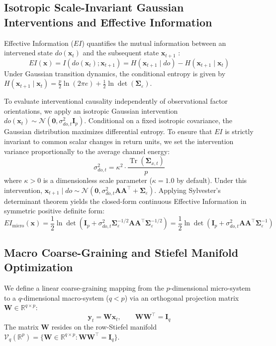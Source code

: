 \documentclass[review,12pt,authoryear]{elsarticle}
\begin{document}
\subsection{Isotropic Scale-Invariant Gaussian Interventions and Effective Information}
Effective Information ($EI$) quantifies the mutual information between an intervened state $do(\mathbf{x}_t)$ and the subsequent state $\mathbf{x}_{t+1}$ \citep{hoel2013quantifying}:
\begin{equation}
EI(\mathbf{x}) = I(do(\mathbf{x}_t); \mathbf{x}_{t+1}) = H(\mathbf{x}_{t+1} \mid do) - H(\mathbf{x}_{t+1} \mid \mathbf{x}_t)
\label{eq:ei_def_eq}
\end{equation}
Under Gaussian transition dynamics, the conditional entropy is given by $H(\mathbf{x}_{t+1} \mid \mathbf{x}_t) = \frac{p}{2}\ln(2\pi e) + \frac{1}{2}\ln\det(\boldsymbol{\Sigma}_\varepsilon)$.

To evaluate interventional causality independently of observational factor orientations, we apply an isotropic Gaussian intervention $do(\mathbf{x}_t) \sim \mathcal{N}(\mathbf{0}, \sigma_{do,t}^2 \mathbf{I}_p)$. Conditional on a fixed isotropic covariance, the Gaussian distribution maximizes differential entropy. To ensure that $EI$ is strictly invariant to common scalar changes in return units, we set the intervention variance proportionally to the average channel energy:
\begin{equation}
\sigma_{do,t}^2 = \kappa^2 \cdot \frac{\operatorname{Tr}(\boldsymbol{\Sigma}_{x,t})}{p}
\label{eq:scale_inv_def}
\end{equation}
where $\kappa > 0$ is a dimensionless scale parameter ($\kappa = 1.0$ by default). Under this intervention, $\mathbf{x}_{t+1} \mid do \sim \mathcal{N}(\mathbf{0}, \sigma_{do,t}^2 \mathbf{A}\mathbf{A}^\top + \boldsymbol{\Sigma}_\varepsilon)$. Applying Sylvester's determinant theorem yields the closed-form continuous Effective Information in symmetric positive definite form:
\begin{equation}
EI_{\text{micro}}(\mathbf{x}) = \frac{1}{2} \ln \det\left( \mathbf{I}_p + \sigma_{do,t}^2 \boldsymbol{\Sigma}_\varepsilon^{-1/2} \mathbf{A}\mathbf{A}^\top \boldsymbol{\Sigma}_\varepsilon^{-1/2} \right) = \frac{1}{2} \ln \det\left( \mathbf{I}_p + \sigma_{do,t}^2 \mathbf{A}\mathbf{A}^\top \boldsymbol{\Sigma}_\varepsilon^{-1} \right)
\label{eq:ei_micro_closed}
\end{equation}

\subsection{Macro Coarse-Graining and Stiefel Manifold Optimization}
We define a linear coarse-graining mapping from the $p$-dimensional micro-system to a $q$-dimensional macro-system ($q < p$) via an orthogonal projection matrix $\mathbf{W} \in \mathbb{R}^{q \times p}$:
\begin{equation}
\mathbf{y}_t = \mathbf{W}\mathbf{x}_t, \qquad \mathbf{W}\mathbf{W}^\top = \mathbf{I}_q
\end{equation}
The matrix $\mathbf{W}$ resides on the row-Stiefel manifold $\mathcal{V}_q(\mathbb{R}^p) = \{ \mathbf{W} \in \mathbb{R}^{q \times p} : \mathbf{W}\mathbf{W}^\top = \mathbf{I}_q \}$. 
\end{document}
